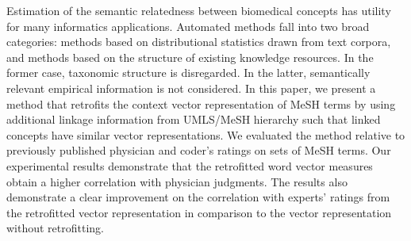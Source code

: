 Estimation of the semantic relatedness between biomedical concepts has utility for many informatics applications. Automated methods fall into two broad categories: methods based on distributional statistics drawn from text corpora, and methods based on the structure of existing knowledge resources. In the former case, taxonomic structure is disregarded. In the latter, semantically relevant empirical information is not considered. In this paper, we present a method that retrofits the context vector representation of MeSH terms by using additional linkage information from UMLS/MeSH hierarchy such that linked concepts have similar vector representations. We evaluated the method relative to previously published physician and coder's ratings on sets of MeSH terms. Our experimental results demonstrate that the retrofitted word vector measures obtain a higher correlation with physician judgments. The results also demonstrate a clear improvement on the correlation with experts' ratings from the retrofitted vector representation in comparison to the vector representation without retrofitting.
